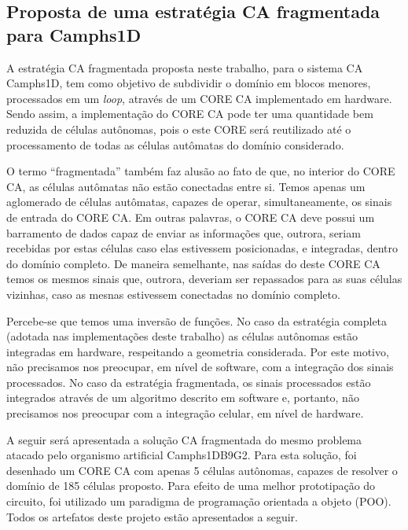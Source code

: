 \begin{apendicesenv}
\partapendices

\chapter{Proposta de uma estratégia CA fragmentada para Camphs1D}

A estratégia CA fragmentada proposta neste trabalho, para o sistema CA Camphs1D, tem como objetivo de subdividir o domínio em blocos menores, processados em um \textit{loop}, através de um CORE CA implementado em hardware. Sendo assim, a implementação do CORE CA pode ter uma quantidade bem reduzida de células autônomas, pois o este CORE será reutilizado até o processamento de todas as células autômatas do domínio considerado.

O termo ``fragmentada'' também faz alusão ao fato de que, no interior do CORE CA, as células autômatas não estão conectadas entre si. Temos apenas um aglomerado de células autômatas, capazes de operar, simultaneamente, os sinais de entrada do CORE CA. Em outras palavras, o CORE CA deve possui um barramento de dados capaz de enviar as informações que, outrora, seriam recebidas por estas células caso elas estivessem posicionadas, e integradas, dentro do domínio completo. De maneira semelhante, nas saídas do deste CORE CA temos os mesmos sinais que, outrora, deveriam ser repassados para as suas células vizinhas, caso as mesnas estivessem conectadas no domínio completo.     

Percebe-se que temos uma inversão de funções. No caso da estratégia completa (adotada nas implementações deste trabalho) as células autônomas estão integradas em hardware, respeitando a geometria considerada. Por este motivo, não precisamos nos preocupar, em nível de software, com a integração dos sinais processados. No caso da estratégia fragmentada, os sinais processados estão integrados através de um algoritmo descrito em software e, portanto, não precisamos nos preocupar com a integração celular, em nível de hardware.

A seguir será apresentada a solução CA fragmentada do mesmo problema atacado pelo organismo artificial Camphs1DB9G2. Para esta solução, foi desenhado um CORE CA com apenas 5 células autônomas, capazes de resolver o domínio de 185 células proposto. Para efeito de uma melhor prototipação do circuito, foi utilizado um paradigma de programação orientada a objeto (POO). Todos os artefatos deste projeto estão apresentados a seguir.


\end{apendicesenv}

